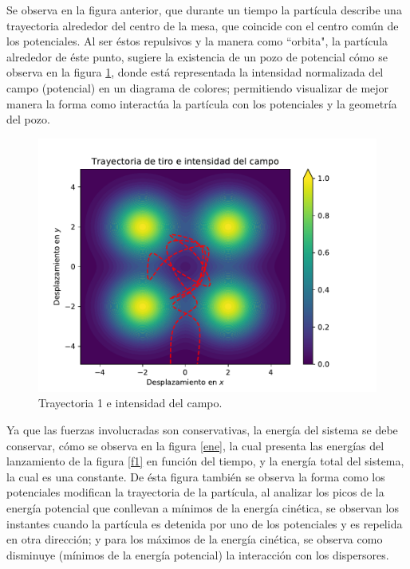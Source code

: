 \documentclass[11pt,letterpaper,twocolumn]{article}
\begin{document}
\par 
Se observa en la figura anterior, que durante un tiempo la partícula describe una trayectoria alrededor del centro de la mesa, que coincide con el centro común de los potenciales. Al ser éstos repulsivos y la manera como “orbita", la partícula alrededor de éste punto, sugiere la existencia de un pozo de potencial cómo se observa en la figura \ref{f2}, donde está representada la intensidad normalizada del campo (potencial) en un diagrama de colores; permitiendo visualizar de mejor manera la forma como interactúa la partícula con los potenciales y la geometría del pozo.\\
\begin{figure}[H]
\centering 
\includegraphics[scale=0.55]{g2.pdf}
\caption{Trayectoria 1 e intensidad del campo.}
\label{f2}
\end{figure}  
\par 
Ya que las fuerzas involucradas son conservativas, la energía del sistema se debe conservar, cómo se observa en la figura \ref{ene}, la cual presenta las energías del lanzamiento de la figura \ref{f1} en función del tiempo, y la energía total del sistema, la cual es una constante. De ésta figura también se observa la forma como los potenciales modifican la trayectoria de la partícula, al analizar los picos de la energía potencial que conllevan a mínimos de la energía cinética, se observan los instantes cuando la partícula es detenida por uno de los potenciales y es repelida en otra dirección; y para los máximos de la energía cinética, se observa como disminuye (mínimos de la energía potencial) la interacción con los dispersores.\\
\end{document}
